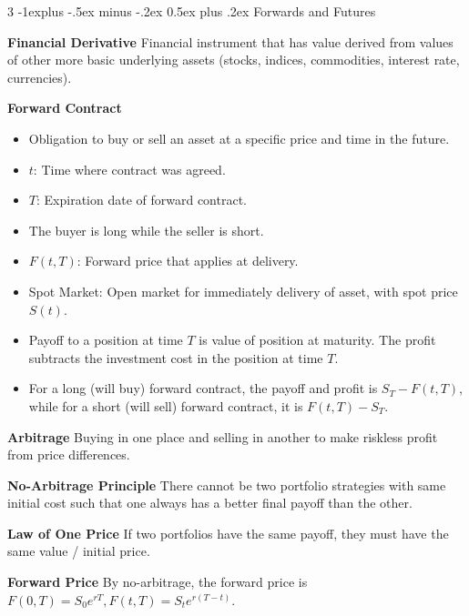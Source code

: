 \documentclass[10pt, landscape]{article}
\makeatletter
\renewcommand{\section}{\@startsection{section}{1}{0mm}%
                                {-1ex plus -.5ex minus -.2ex}%
                                {0.5ex plus .2ex}%
                                {\normalfont\large\bfseries}}
\renewcommand{\section}{\@startsection{section}{2}{0mm}%
                                {-1explus -.5ex minus -.2ex}%
                                {0.5ex plus .2ex}%
                                {\normalfont\normalsize\bfseries}}
\makeatother
\begin{document}
\begin{multicols*}{3}
\section{Forwards and Futures}

\textbf{Financial Derivative} Financial instrument that has value derived from values of other more basic underlying assets (stocks, indices, commodities, interest rate, currencies).

\textbf{Forward Contract}
\begin{itemize}
    \item Obligation to buy or sell an asset at a specific price and time in the future.
    \item $t$: Time where contract was agreed.
    \item $T$: Expiration date of forward contract.
    \item The buyer is long while the seller is short.
    \item $F(t, T)$: Forward price that applies at delivery.
    \item Spot Market: Open market for immediately delivery of asset, with spot price $S(t)$.
    \item Payoff to a position at time $T$ is value of position at maturity. The profit subtracts the investment cost in the position at time $T$.
    \item For a long (will buy) forward contract, the payoff and profit is $S_T-F(t, T)$, while for a short (will sell) forward contract, it is $F(t, T)-S_T$.
\end{itemize}

\textbf{Arbitrage} Buying in one place and selling in another to make riskless profit from price differences.

\textbf{No-Arbitrage Principle} There cannot be two portfolio strategies with same initial cost such that one always has a better final payoff than the other.

\textbf{Law of One Price} If two portfolios have the same payoff, they must have the same value / initial price.

\textbf{Forward Price} By no-arbitrage, the forward price is $F(0, T)=S_0e^{rT}, F(t, T)=S_te^{r(T-t)}$.


\end{multicols*}
\end{document}
